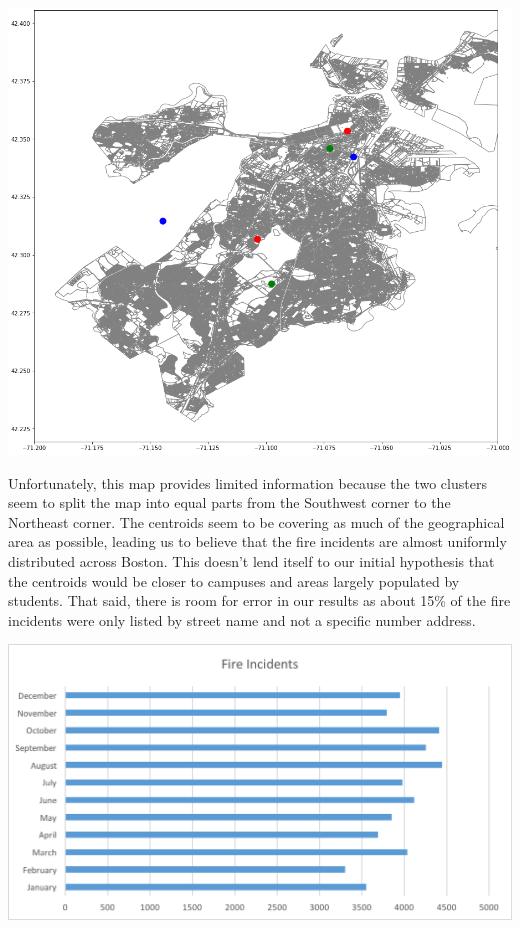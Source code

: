 \documentclass[journal, a4paper]{IEEEtran}
\begin{document}
\includegraphics[width=\columnwidth]{fireMap.png}
\newline
\tab

Unfortunately, this map provides limited information because the two clusters seem to split the map into equal parts from the Southwest corner to the Northeast corner. The centroids seem to be covering as much of the geographical area as possible, leading us to believe that the fire incidents are almost uniformly distributed across Boston. This doesn’t lend itself to our initial hypothesis that the centroids would be closer to campuses and areas largely populated by students. That said, there is room for error in our results as about 15\% of the fire incidents were only listed by street name and not a specific number address.
\newline

\includegraphics[width=\columnwidth]{fireChart.png}
\newline
\tab
\end{document}
